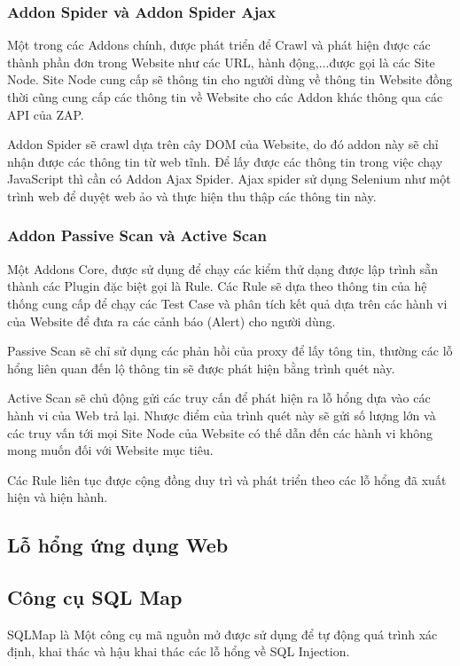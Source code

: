 \documentclass[./../main.tex]{subfiles}
\begin{document}
\subsubsection{Addon Spider và Addon Spider Ajax}
Một trong các Addons chính, được phát triển để Crawl và phát hiện được các thành phần đơn trong Website như các URL, hành động,...được gọi là các Site Node. Site Node cung cấp sẽ
thông tin cho người dùng về thông tin Website đồng thời cũng cung cấp các thông tin về Website cho các Addon khác thông qua các API của ZAP.

Addon Spider sẽ crawl dựa trên cây DOM của Website, do đó addon này sẽ chỉ nhận được các thông tin từ web tĩnh. Để lấy được các thông tin trong việc chạy JavaScript thì cần có
Addon Ajax Spider. Ajax spider sử dụng Selenium như một trình web để duyệt web ảo và thực hiện thu thập các thông tin này.
\subsubsection{Addon Passive Scan và Active Scan}
Một Addons Core, được sử dụng để chạy các kiểm thử dạng được lập trình sẵn thành các Plugin đặc biệt gọi là Rule. Các Rule sẽ dựa theo thông tin của hệ thống cung cấp để
chạy các Test Case và phân tích kết quả dựa trên các hành vi của Website để đưa ra các cảnh báo (Alert) cho người dùng.

Passive Scan sẽ chỉ sử dụng các phản hồi của proxy để lấy tông tin, thường các lỗ hổng liên quan đến lộ thông tin sẽ được phát hiện bằng trình quét này.

Active Scan sẽ chủ động gửi các truy cấn để phát hiện ra lỗ hổng dựa vào các hành vi của Web trả lại. Nhược điểm của trình quét này sẽ gửi số lượng lớn và
các truy vấn tới mọi Site Node của Website có thế dẫn đến các hành vi không mong muốn đối với Website mục tiêu.

Các Rule liên tục được cộng đồng duy trì và phát triển theo các lỗ hổng đã xuất hiện và hiện hành.

\subsection{Lỗ hổng ứng dụng Web}

\subsubsection{}

\subsection{Công cụ SQL Map}
SQLMap là Một công cụ mã nguồn mở được sử dụng để tự động quá trình xác định, khai thác và hậu khai thác các lỗ hổng về SQL Injection.
\end{document}
